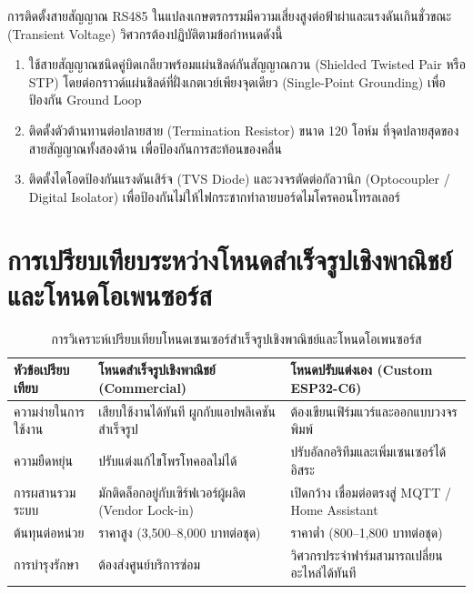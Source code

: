 \begin{warningbox}
การติดตั้งสายสัญญาณ RS485 ในแปลงเกษตรกรรมมีความเสี่ยงสูงต่อฟ้าผ่าและแรงดันเกินชั่วขณะ (Transient Voltage) วิศวกรต้องปฏิบัติตามข้อกำหนดดังนี้
\begin{enumerate}
    \item ใช้สายสัญญาณชนิดคู่บิดเกลียวพร้อมแผ่นชิลด์กันสัญญาณกวน (Shielded Twisted Pair หรือ STP) โดยต่อกราวด์แผ่นชิลด์ที่ฝั่งเกตเวย์เพียงจุดเดียว (Single-Point Grounding) เพื่อป้องกัน Ground Loop
    \item ติดตั้งตัวต้านทานต่อปลายสาย (Termination Resistor) ขนาด 120 โอห์ม ที่จุดปลายสุดของสายสัญญาณทั้งสองด้าน เพื่อป้องกันการสะท้อนของคลื่น
    \item ติดตั้งไดโอดป้องกันแรงดันเสิร์จ (TVS Diode) และวงจรตัดต่อกัลวานิก (Optocoupler / Digital Isolator) เพื่อป้องกันไม่ให้ไฟกระชากทำลายบอร์ดไมโครคอนโทรลเลอร์
\end{enumerate}
\end{warningbox}

\section{การเปรียบเทียบระหว่างโหนดสำเร็จรูปเชิงพาณิชย์และโหนดโอเพนซอร์ส}

\begin{table}[H]
\caption{การวิเคราะห์เปรียบเทียบโหนดเซนเซอร์สำเร็จรูปเชิงพาณิชย์และโหนดโอเพนซอร์ส}
\label{tab:commercial_vs_custom}
\centering
\small
\begin{tabularx}{\textwidth}{p{3.0cm} >{\raggedright\arraybackslash}X >{\raggedright\arraybackslash}X}
\toprule
\textbf{หัวข้อเปรียบเทียบ} & \textbf{โหนดสำเร็จรูปเชิงพาณิชย์ (Commercial)} & \textbf{โหนดปรับแต่งเอง (Custom ESP32-C6)} \\
\midrule
ความง่ายในการใช้งาน & เสียบใช้งานได้ทันที ผูกกับแอปพลิเคชันสำเร็จรูป & ต้องเขียนเฟิร์มแวร์และออกแบบวงจรพิมพ์ \\
ความยืดหยุ่น & ปรับแต่งแก้ไขโพรโทคอลไม่ได้ & ปรับอัลกอริทึมและเพิ่มเซนเซอร์ได้อิสระ \\
การผสานรวมระบบ & มักติดล็อกอยู่กับเซิร์ฟเวอร์ผู้ผลิต (Vendor Lock-in) & เปิดกว้าง เชื่อมต่อตรงสู่ MQTT / Home Assistant \\
ต้นทุนต่อหน่วย & ราคาสูง (3,500--8,000 บาทต่อชุด) & ราคาต่ำ (800--1,800 บาทต่อชุด) \\
การบำรุงรักษา & ต้องส่งศูนย์บริการซ่อม & วิศวกรประจำฟาร์มสามารถเปลี่ยนอะไหล่ได้ทันที \\
\bottomrule
\end{tabularx}
\end{table}


